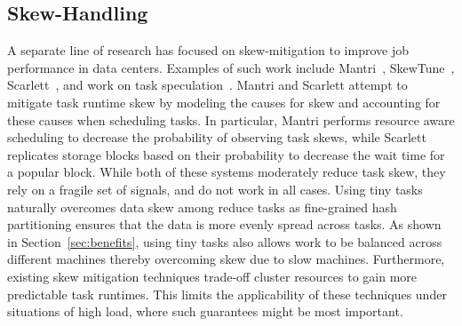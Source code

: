 \subsection{Skew-Handling}
A separate line of research has focused on skew-mitigation to improve job
performance in data centers. Examples of such work include
Mantri~\cite{ananthanarayanan2010reining}, SkewTune~\cite{kwon2012skewtune},
Scarlett~\cite{ananthanarayanan2011scarlett}, and work on task
speculation~\cite{zaharia2008improving}. Mantri and Scarlett attempt to
mitigate task runtime skew by modeling the causes for skew and accounting for
these causes when scheduling tasks. In particular, Mantri performs resource aware scheduling to decrease the
probability of observing task skews, while Scarlett replicates storage blocks
based on their probability to decrease the wait time for a popular block. While
both of these systems moderately reduce task skew, they rely on a fragile set of
signals, and do not work in all cases. Using tiny tasks naturally overcomes data
skew among reduce tasks as fine-grained hash partitioning ensures that the data is
more evenly spread across tasks. As shown in
Section~\ref{sec:benefits}, using tiny tasks also allows work to be balanced across
different machines thereby overcoming skew due to slow machines.
Furthermore, existing skew mitigation techniques trade-off cluster resources to
gain more predictable task runtimes. This limits the applicability of these
techniques under situations of high load, where such guarantees might be most
important.

